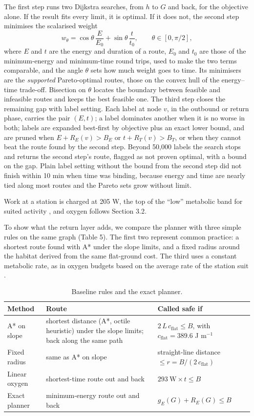 \documentclass[11pt,a4paper]{article}
\begin{document}
The first step runs two Dijkstra searches, from $h$ to $G$ and back, for the objective alone. If the result fits every limit, it is optimal. If it does not, the second step minimises the scalarised weight \[w_\theta = \cos\theta\,\frac{E}{E_0} + \sin\theta\,\frac{t}{t_0},\qquad \theta \in [0, \pi/2],\] where $E$ and $t$ are the energy and duration of a route, $E_0$ and $t_0$ are those of the minimum-energy and minimum-time round trips, used to make the two terms comparable, and the angle $\theta$ sets how much weight goes to time. Its minimisers are the \emph{supported} Pareto-optimal routes, those on the convex hull of the energy--time trade-off. Bisection on $\theta$ locates the boundary between feasible and infeasible routes and keeps the best feasible one. The third step closes the remaining gap with label setting. Each label at node $v$, in the outbound or return phase, carries the pair $(E, t)$; a label dominates another when it is no worse in both; labels are expanded best-first by objective plus an exact lower bound, and are pruned when $E + R_E(v) > B_E$ or $t + R_T(v) > B_T$, or when they cannot beat the route found by the second step. Beyond 50,000 labels the search stops and returns the second step's route, flagged as not proven optimal, with a bound on the gap. Plain label setting without the bound from the second step did not finish within 10 min when time was binding, because energy and time are nearly tied along most routes and the Pareto sets grow without limit.

Work at a station is charged at 205 W, the top of the ``low'' metabolic band for suited activity \cite{NASA-xEMU-met}, and oxygen follows Section 3.2.

To show what the return layer adds, we compare the planner with three simple rules on the same graph (Table 5). The first two represent common practice: a shortest route found with A* under the slope limits, and a fixed radius around the habitat derived from the same flat-ground cost. The third uses a constant metabolic rate, as in oxygen budgets based on the average rate of the station suit \cite{NASA-Mars-mass}.

\begin{table}[H]
\centering\small
\caption{Baseline rules and the exact planner.}
\begin{tabularx}{\linewidth}{>{\raggedright\arraybackslash}X>{\raggedright\arraybackslash}X>{\raggedright\arraybackslash}X}
\toprule
Method & Route & Called safe if \\
\midrule
A* on slope & shortest distance (A*, octile heuristic) under the slope limits; back along the same path & $2\,L\,c_\text{flat} \le B$, with $c_\text{flat} = 389.6$ J m$^{-1}$ \\
Fixed radius & same as A* on slope & straight-line distance $\le r = B / (2\,c_\text{flat})$ \\
Linear oxygen & shortest-time route out and back & $293\ \text{W} \times t \le B$ \\
Exact planner & minimum-energy route out and back & $g_E(G) + R_E(G) \le B$ \\
\bottomrule
\end{tabularx}
\end{table}
\end{document}
